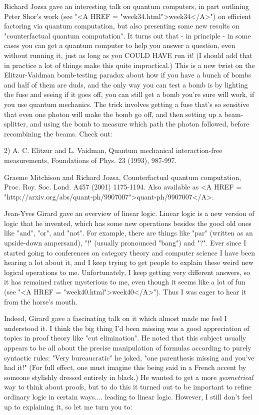 Richard Jozsa gave an interesting talk on quantum computers, in part
outlining Peter Shor's work (see "<A HREF = "week34.html">week34</A>") 
on efficient factoring via
quantum computation, but also presenting some new results on
"counterfactual quantum computation".  It turns out that - in
principle - in some cases you can get a quantum computer to help you
answer a question, even without running it, just as long as you COULD
HAVE run it!  (I should add that in practice a lot of things make this
quite impractical.)  This is a new twist on the Elitzur-Vaidman bomb-testing
paradox about how if you have a bunch of bombs and half of them are
duds, and the only way you can test a bomb is by lighting the fuse and
seeing if it goes off, you can still get a bomb you're sure will work,
if you use quantum mechanics.  The trick involves getting a fuse that's
so sensitive that even one photon will make the bomb go off, and then
setting up a beam-splitter, and using the bomb to measure which path
the photon followed, before recombining the beams.  Check out:

2) A. C. Elitzur and L. Vaidman, Quantum mechanical interaction-free
measurements, Foundations of Phys. 23 (1993), 987-997.

Graeme Mitchison and Richard Jozsa, Counterfactual quantum computation,
Proc. Roy. Soc. Lond. A457 (2001) 1175-1194.  Also available as
<A HREF = "http://arxiv.org/abs/quant-ph/9907007">quant-ph/9907007</A>.

Jean-Yves Girard gave an overview of linear logic.  Linear logic is a
new version of logic that he invented, which has some new operations
besides the good old ones like "and", "or", and "not".  For example,
there are things like "par" (written as an upside-down ampersand), "!"
(usually pronounced "bang") and "?".  Ever since I started going to
conferences on category theory and computer science I have been hearing
a lot about it, and I keep trying to get people to explain these weird
new logical operations to me.  Unfortunately, I keep getting very
different answers, so it has remained rather mysterious to me, even
though it seems like a lot of fun (see "<A HREF = "week40.html">week40</A>").  Thus I was eager to
hear it from the horse's mouth.

Indeed, Girard gave a fascinating talk on it which almost made me feel I
understood it.  I think the big thing I'd been missing was a good
appreciation of topics in proof theory like "cut elimination".  He noted
that this subject usually appears to be all about the precise
manipulation of formulas according to purely syntactic rules: "Very
bureaucratic" he joked, "one parenthesis missing and you've had it!"
(For full effect, one must imagine this being said in a French accent by
someone stylishly dressed entirely in black.)  He wanted to get a more
\emph{geometrical} way to think about proofs, but to do this it turned out to
be important to refine ordinary logic in certain ways.... leading to
linear logic.  However, I still don't feel up to explaining it, so let
me turn you to:

